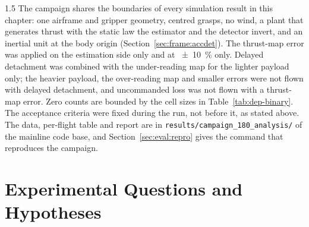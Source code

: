 \begin{spacing}{1.5}
The campaign shares the boundaries of every simulation result in this chapter:
one airframe and gripper geometry, centred grasps, no wind, a plant that
generates thrust with the static law the estimator and the detector invert, and
an inertial unit at the body origin (Section~\ref{sec:frame:accdet}). The
thrust-map error was applied on the estimation side only and at
\SI{\pm10}{\percent} only. Delayed detachment was combined with the
under-reading map for the lighter payload only; the heavier payload, the
over-reading map and smaller errors were not flown with delayed detachment, and
uncommanded loss was not flown with a thrust-map error. Zero counts are bounded
by the cell sizes in Table~\ref{tab:dep-binary}. The acceptance criteria were
fixed during the run, not before it, as stated above. The data, per-flight table
and report are in \texttt{results/campaign\_180\_analysis/} of the mainline code
base, and Section~\ref{sec:eval:repro} gives the command that reproduces the
campaign.

\section{Experimental Questions and Hypotheses}\label{sec:eval:design}


\end{spacing}
